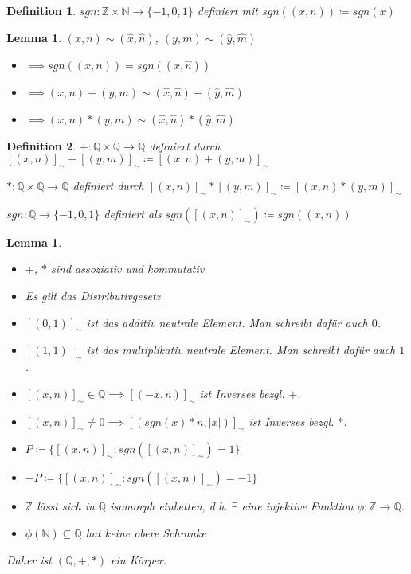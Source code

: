 \documentclass[twocolumn]{article}
\newtheorem{lemma}[theorem]{Lemma}
\newtheorem{definition}{Definition}[section]
\begin{document}
\begin{definition}
	$sgn:\mathbb{Z}\times\mathbb{N}\rightarrow\{-1,0,1\}$ definiert mit $sgn((x,n))\coloneqq sgn(x)$
\end{definition}

\begin{lemma}
	$(x,n)\sim(\hat{x},\hat{n})$, $(y,m)\sim(\hat{y},\hat{m})$
	
	\begin{itemize}
		\item $\implies sgn((x,n)) = sgn((\hat{x}, \hat{n}))$
		\item $\implies (x,n)+(y,m)\sim(\hat{x},\hat{n})+(\hat{y},\hat{m})$
		\item $\implies (x,n)*(y,m)\sim(\hat{x},\hat{n})*(\hat{y},\hat{m})$
	\end{itemize}
\end{lemma}

\begin{definition}
	$+:\mathbb{Q}\times\mathbb{Q}\rightarrow\mathbb{Q}$ definiert durch $[(x,n)]_{\sim}+[(y,m)]_{\sim}\coloneqq[(x,n)+(y,m)]_{\sim}$
	
	$*:\mathbb{Q}\times\mathbb{Q}\rightarrow\mathbb{Q}$ definiert durch $[(x,n)]_{\sim}*[(y,m)]_{\sim}\coloneqq[(x,n)*(y,m)]_{\sim}$
	
	$sgn: \mathbb{Q}\rightarrow\{-1,0,1\}$ definiert als $sgn([(x,n)]_{\sim})\coloneqq sgn((x,n))$
\end{definition}

\begin{lemma}
	\begin{itemize}
		\item $+$, $*$ sind assoziativ und kommutativ
		\item Es gilt das Distributivgesetz
		\item $[(0,1)]_{\sim}$ ist das additiv neutrale Element. Man schreibt dafür auch $0$.
		\item $[(1,1)]_{\sim}$ ist das multiplikativ neutrale Element. Man schreibt dafür auch $1$.
		\item $[(x,n)]_{\sim} \in \mathbb{Q} \implies [(-x,n)]_{\sim}$ ist Inverses bezgl. $+$.
		\item $[(x,n)]_{\sim} \neq 0 \implies [(sgn(x)*n,|x|)]_{\sim}$ ist Inverses bezgl. $*$.
		\item $P \coloneqq \{[(x,n)]_{\sim}:sgn([(x,n)]_{\sim})=1\}$
		\item $-P \coloneqq \{[(x,n)]_{\sim}:sgn([(x,n)]_{\sim})=-1\}$
		\item $\mathbb{Z}$ lässt sich in $\mathbb{Q}$ isomorph einbetten, d.h. $\exists$ eine injektive Funktion $\phi: \mathbb{Z}\rightarrow\mathbb{Q}$.
		\item $\phi(\mathbb{N}) \subseteq \mathbb{Q}$ hat keine obere Schranke
	\end{itemize}

	Daher ist $(\mathbb{Q},+,*)$ ein Körper.
\end{lemma}
\end{document}
